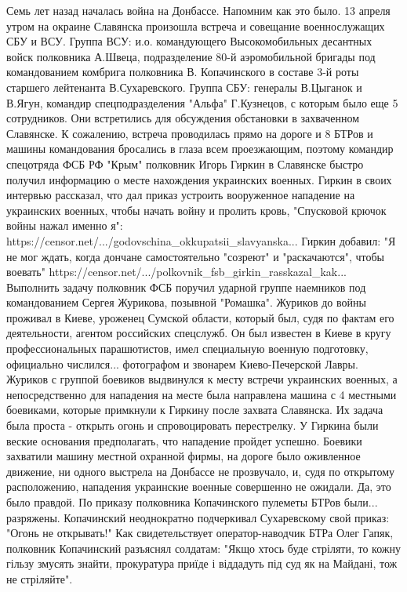 Семь лет назад началась война на Донбассе. Напомним как это было.
13 апреля утром на окраине Славянска произошла  встреча и совещание военнослужащих СБУ и ВСУ. Группа ВСУ: и.о. командующего Высокомобильных десантных войск полковника А.Швеца,  подразделение  80-й аэромобильной бригады под командованием комбрига полковника В. Копачинского в составе 3-й роты старшего лейтенанта В.Сухаревского. Группа СБУ: генералы В.Цыганок и В.Ягун, командир спецподразделения "Альфа" Г.Кузнецов, с которым было еще 5 сотрудников. Они встретились для обсуждения обстановки в захваченном Славянске.
К сожалению, встреча проводилась прямо на дороге и 8 БТРов и машины командования бросались в глаза всем проезжающим, поэтому командир спецотряда ФСБ РФ "Крым" полковник Игорь Гиркин в Славянске быстро получил информацию о месте нахождения украинских военных.
Гиркин в своих интервью рассказал, что  дал приказ устроить вооруженное нападение на украинских военных, чтобы начать войну и пролить кровь, "Спусковой крючок войны нажал именно я": 
https://censor.net/.../godovschina_okkupatsii_slavyanska...
Гиркин добавил: "Я не мог ждать, когда дончане самостоятельно "созреют" и "раскачаются", чтобы воевать" https://censor.net/.../polkovnik_fsb_girkin_rasskazal_kak...
Выполнить задачу полковник ФСБ поручил ударной группе наемников под командованием Сергея Журикова, позывной "Ромашка". Журиков до войны проживал в Киеве, уроженец Сумской области, который был, судя по фактам его деятельности, агентом российских спецслужб. Он был известен в Киеве в кругу профессиональных парашютистов, имел специальную военную подготовку, официально числился... фотографом и звонарем Киево-Печерской Лавры. Журиков с группой боевиков выдвинулся к месту встречи украинских военных, а непосредственно для нападения на месте была направлена машина с 4 местными боевиками, которые примкнули к Гиркину после захвата Славянска. Их задача была проста - открыть огонь и спровоцировать перестрелку. У Гиркина были веские основания предполагать, что нападение пройдет успешно. 
Боевики захватили машину местной охранной фирмы, на дороге было оживленное движение, ни одного выстрела на Донбассе не прозвучало, и, судя по открытому расположению, нападения украинские военные совершенно не ожидали.
Да, это было правдой. По приказу полковника Копачинского пулеметы БТРов были... разряжены. Копачинский неоднократно подчеркивал Сухаревскому свой приказ: "Огонь не открывать!" Как свидетельствует оператор-наводчик БТРа Олег Гапяк, полковник Копачинский разъяснял солдатам: "Якщо хтось буде стріляти, то кожну гільзу змусять знайти, прокуратура приїде і віддадуть під суд як на Майдані, тож не стріляйте". 
